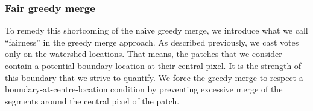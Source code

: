 \subsubsection{Fair greedy merge}
To remedy this shortcoming of the na\"{\i}ve greedy merge, we introduce what we call ``fairness'' in the greedy merge approach. As described previously, we cast votes only on the watershed locations. That means, the patches that we consider contain a potential boundary location at their central pixel. It is the strength of this boundary that we strive to quantify. We force %
the greedy merge to respect a boundary-at-centre-location condition by preventing excessive merge of the segments around the central pixel of the patch.

\begin{figure}[t]
\centering

  \qquad\qquad\qquad\qquad\qquad


\end{figure}
